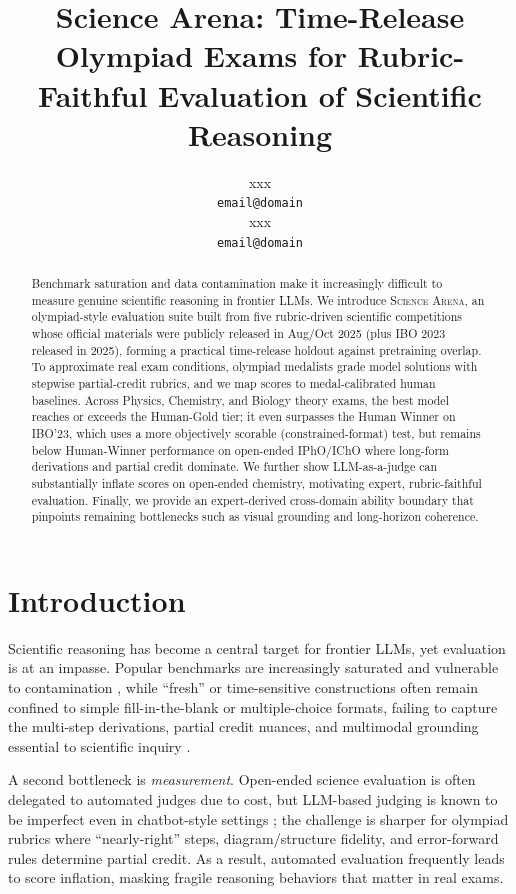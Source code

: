 \documentclass[11pt]{article}
\title{Science Arena: Time-Release Olympiad Exams for Rubric-Faithful Evaluation of Scientific Reasoning}
\author{xxx \\
  \texttt{email@domain} \\\And
  xxx \\
  \texttt{email@domain} \\}
\begin{document}
\maketitle
\begin{abstract}
Benchmark saturation and data contamination make it increasingly difficult to measure genuine scientific reasoning in frontier LLMs. We introduce \textsc{Science Arena}, an olympiad-style evaluation suite built from five rubric-driven scientific competitions whose official materials were publicly released in Aug/Oct 2025 (plus IBO 2023 released in 2025), forming a practical time-release holdout against pretraining overlap. To approximate real exam conditions, olympiad medalists grade model solutions with stepwise partial-credit rubrics, and we map scores to medal-calibrated human baselines. Across Physics, Chemistry, and Biology theory exams, the best model reaches or exceeds the Human-Gold tier; it even surpasses the Human Winner on IBO'23, which uses a more objectively scorable (constrained-format) test, but remains below Human-Winner performance on open-ended IPhO/IChO where long-form derivations and partial credit dominate. We further show LLM-as-a-judge can substantially inflate scores on open-ended chemistry, motivating expert, rubric-faithful evaluation. Finally, we provide an expert-derived cross-domain ability boundary that pinpoints remaining bottlenecks such as visual grounding and long-horizon coherence.


\end{abstract}


\section{Introduction}
Scientific reasoning has become a central target for frontier LLMs, yet evaluation is at an impasse.
Popular benchmarks are increasingly saturated and vulnerable to contamination \citep{hendrycks2021mmlu,rein2023gpqa,white2024livebench}, while “fresh” or time-sensitive constructions often remain confined to simple fill-in-the-blank or multiple-choice formats, failing to capture the multi-step derivations, partial credit nuances, and multimodal grounding essential to scientific inquiry \citep{latesteval2023,white2024livebench,wang2023scibench,yue2023mmmu,he2024olympiadbench,lu2022scienceqa,mirza2025chembench}.

A second bottleneck is \emph{measurement}.
Open-ended science evaluation is often delegated to automated judges due to cost, but LLM-based judging is known to be imperfect even in chatbot-style settings \citep{zheng2023judging}; the challenge is sharper for olympiad rubrics where “nearly-right” steps, diagram/structure fidelity, and error-forward rules determine partial credit.
As a result, automated evaluation frequently leads to score inflation, masking fragile reasoning behaviors that matter in real exams.
\end{document}
